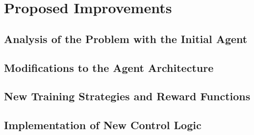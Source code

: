 \chapter{Proposed Improvements}

\section{Analysis of the Problem with the Initial Agent}

\section{Modifications to the Agent Architecture}

\section{New Training Strategies and Reward Functions}

\section{Implementation of New Control Logic}